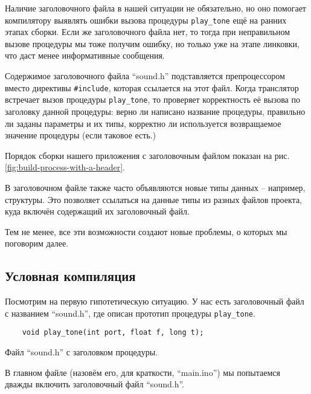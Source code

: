 \documentclass[../sparc.tex]{subfiles}
\begin{document}
Наличие заголовочного файла в нашей ситуации не обязательно, но оно помогает
компилятору выявлять ошибки вызова процедуры \texttt{play_tone} ещё на
ранних этапах сборки.  Если же заголовочного файла нет, то тогда при
неправильном вызове процедуры мы тоже получим ошибку, но только уже на этапе
линковки, что даст менее информативные сообщения.

Содержимое заголовочного файла ``sound.h'' подставляется препроцессором вместо
директивы \texttt{#include}, которая ссылается на этот файл.  Когда
транслятор встречает вызов процедуры \texttt{play_tone}, то проверяет
корректность её вызова по заголовку данной процедуры: верно ли написано название
процедуры, правильно ли заданы параметры и их типы, корректно ли используется
возвращаемое значение процедуры (если таковое есть.)


Порядок сборки нашего приложения с заголовочным файлом показан на
рис. \ref{fig:build-process-with-a-header}.

В заголовочном файле также часто объявляются новые типы данных -- например,
структуры.  Это позволяет ссылаться на данные типы из разных файлов проекта,
куда включён содержащий их заголовочный файл.

Тем не менее, все эти возможности создают новые проблемы, о которых мы поговорим
далее.

\subsection{Условная компиляция}
\label{subsection:conditional-compiling}

Посмотрим на первую гипотетическую ситуацию.  У нас есть заголовочный файл с
названием ``sound.h'', где описан прототип процедуры
\texttt{play_tone}.

\begin{listing}[H]
  \begin{verbatim}
    void play_tone(int port, float f, long t);
  \end{verbatim}
  \label{listing:game-dev-engine-procedure-header-2}
  \caption{Файл ``sound.h'' с заголовком процедуры.}
\end{listing}

В главном файле (назовём его, для краткости, ``main.ino'') мы попытаемся дважды
включить заголовочный файл ``sound.h''.
\end{document}
